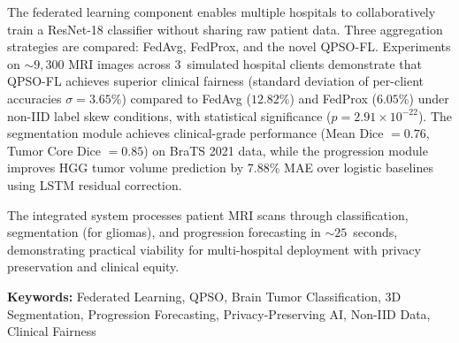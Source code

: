 \documentclass[12pt,a4paper,oneside]{report}
\begin{document}
The federated learning component enables multiple hospitals to collaboratively train a ResNet-18 classifier without sharing raw patient data. Three aggregation strategies are compared: FedAvg, FedProx, and the novel QPSO-FL. Experiments on ${\sim}9{,}300$ MRI images across 3~simulated hospital clients demonstrate that QPSO-FL achieves superior clinical fairness (standard deviation of per-client accuracies $\sigma = 3.65\%$) compared to FedAvg ($12.82\%$) and FedProx ($6.05\%$) under non-IID label skew conditions, with statistical significance ($p = 2.91 \times 10^{-22}$). The segmentation module achieves clinical-grade performance (Mean Dice $= 0.76$, Tumor Core Dice $= 0.85$) on BraTS 2021 data, while the progression module improves HGG tumor volume prediction by 7.88\% MAE over logistic baselines using LSTM residual correction.

The integrated system processes patient MRI scans through classification, segmentation (for gliomas), and progression forecasting in ${\sim}25$~seconds, demonstrating practical viability for multi-hospital deployment with privacy preservation and clinical equity.

\textbf{Keywords:} Federated Learning, QPSO, Brain Tumor Classification, 3D Segmentation, Progression Forecasting, Privacy-Preserving AI, Non-IID Data, Clinical Fairness

\newpage
\tableofcontents
\newpage
\listoffigures
\newpage
\listoftables

\newpage
{}










\newpage



\appendix



\end{document}
